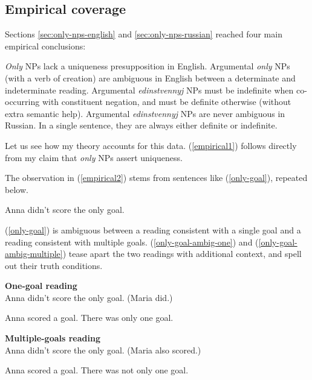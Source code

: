 \subsection{Empirical coverage}
Sections \ref{sec:only-nps-english} and \ref{sec:only-nps-russian} reached four main empirical conclusions:

\begin{exe}
	\ex \label{empirical1} \textit{Only} NPs lack a uniqueness presupposition in English.
	\ex \label{empirical2} Argumental \textit{only} NPs (with a verb of creation) are ambiguous in English between a determinate and indeterminate reading.
	\ex \label{empirical3} Argumental \textit{edinstvennyj} NPs must be indefinite when co-occurring with constituent negation, and must be definite otherwise (without extra semantic help).
	\ex \label{empirical4} Argumental \textit{edinstvennyj} NPs are never ambiguous in Russian. In a single sentence, they are always either definite or indefinite.
\end{exe}

Let us see how my theory accounts for this data. (\ref{empirical1}) follows directly from my claim that \textit{only} NPs assert uniqueness.

The observation in (\ref{empirical2}) stems from sentences like (\ref{only-goal}), repeated below.

\begin{exe}
	 Anna didn't score the only goal.
\end{exe}

(\ref{only-goal}) is ambiguous between a reading consistent with a single goal and a reading consistent with multiple goals. (\ref{only-goal-ambig-one}) and (\ref{only-goal-ambig-multiple}) tease apart the two readings with additional context, and spell out their truth conditions.

\begin{exe}
	\ex \label{only-goal-ambig-one} \textbf{One-goal reading} \\ Anna didn't score the only goal. (Maria did.)
	\begin{xlist}
		\ex Anna scored a goal.
		\ex There was only one goal.
	\end{xlist}

	\ex \label{only-goal-ambig-multiple} \textbf{Multiple-goals reading} \\ Anna didn't score the only goal. (Maria also scored.)
	\begin{xlist}
		\ex Anna scored a goal.
		\ex There was not only one goal.
	\end{xlist}
\end{exe}


